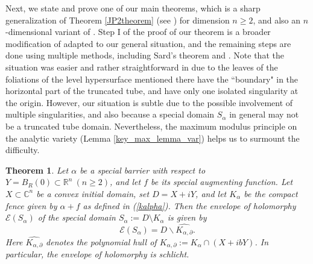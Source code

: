 \documentclass[12pt,reqno, a4paper]{amsart}
\newtheorem{theorem}{Theorem}[section]
\theoremstyle{definition}
\theoremstyle{definition}
\numberwithin{equation}{section}
\def\R{\mathbb{R}}                              %
\def\C{\mathbb{C}}                              %
\begin{document}
Next, we state and prove one of our main theorems, which is a sharp generalization of Theorem \ref{JP2theorem} (see \cite[Theorem 1]{JP2}) for dimension $n\geq 2$, and also an $n$-dimensional variant of \cite[Theorem 1.2]{haz-por}. Step I of the proof of our theorem is a broader modification of \cite[Example 4.4.(a)]{haz-por} adapted to our general situation, and the remaining steps are done using multiple methods, including Sard's theorem and \cite[Theorem 5.2.11]{stout}. Note that the situation was easier and rather straightforward in {\cite[Example 4.4. (a)]{haz-por}} due to the leaves of the foliations of the level hypersurface mentioned there have the ``boundary" in the horizontal part of the truncated tube, and have only one isolated singularity at the origin. However, our situation is subtle due to the possible involvement of multiple singularities, and also because a special domain $S_{\alpha}$ in general may not be a truncated tube domain. Nevertheless, the maximum modulus principle on the analytic variety ({Lemma \ref{key_max_lemma_var}}) helps us to surmount the difficulty. 

\begin{theorem} \label{1st_theo}
Let $\alpha$ be a special barrier with respect to $Y=B_R(0)\subset \R^n~(n\geq 2)$, and let $f$ be its special augmenting function. Let $X\subset \C^n$ be a convex initial domain, set $D=X+iY$, and let $K_{\alpha}$ be the compact fence given by $\alpha+f$ as defined in (\ref{kalpha}). Then the envelope of holomorphy $\mathcal{E}(S_{\alpha})$ of the special domain ${S_{\alpha}:=D \setminus K_{\alpha}}$ is given by $$\mathcal{E}(S_{\alpha})=D\backslash\widehat{K_{\alpha, \partial}}.$$ Here  $\widehat{K_{\alpha,\partial}}$ denotes the polynomial hull of ${K_{\alpha,\partial}}:=K_{\alpha}\cap (X+ibY)$. In particular, the envelope of holomorphy is schlicht.
\end{theorem}
\end{document}
